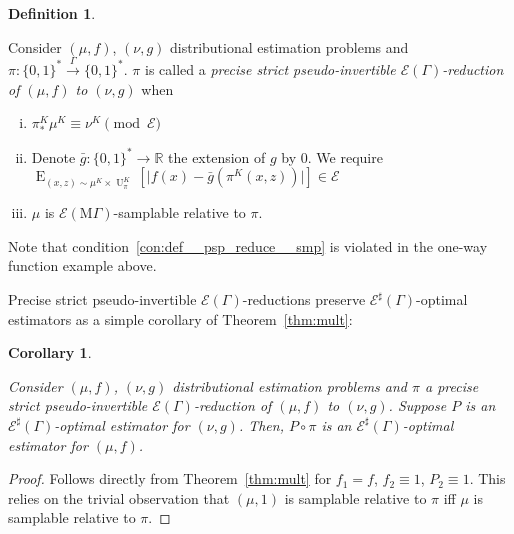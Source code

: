 \documentclass{article}
\numberwithin{equation}{section}
\theoremstyle{definition}
\newtheorem{definition}{Definition}[section]
\theoremstyle{plain}
\newtheorem{corollary}{Corollary}[section]
\newcommand{\Bool}{\{0,1\}}
\newcommand{\Words}{{\Bool^*}}
\DeclareMathOperator{\E}{E}
\DeclareMathOperator{\Un}{U}
\newcommand{\Reals}{\mathbb{R}}
\newcommand{\Abs}[1]{\lvert #1 \rvert}
\newcommand{\MGrow}{\mathrm{M}\Gamma}
\newcommand{\Fall}{\mathcal{E}}
\newcommand{\EG}{\Fall(\Gamma)}
\newcommand{\ESG}{\Fall^\sharp(\Gamma)}
\newcommand{\EMG}{\Fall(\MGrow)}
\newcommand{\Scheme}{\xrightarrow{\Gamma}}
\begin{document}
\begin{samepage}
\begin{definition}
\label{def:psp_reduce}

Consider $(\mu,f)$, $(\nu,g)$ distributional estimation problems and ${\pi: \Words \Scheme \Words}$. $\pi$ is called a \emph{precise strict pseudo-invertible $\EG$-reduction of $(\mu,f)$ to $(\nu,g)$} when

\begin{enumerate}[(i)]

\item\label{con:def__psp_reduce__dist} $\pi_*^K\mu^{K} \equiv \nu^{K} \pmod \Fall$

\item\label{con:def__psp_reduce__fun} Denote ${\bar{g}: \Words \rightarrow \Reals}$ the extension of $g$ by 0. We require $\E_{(x,z) \sim \mu^{K} \times \Un_\pi^{K}}[\Abs{f(x)-\bar{g}(\pi^{K}(x,z))}] \in \Fall$

\item\label{con:def__psp_reduce__smp} $\mu$ is $\EMG$-samplable relative to $\pi$.

\end{enumerate}

\end{definition}
\end{samepage}

Note that condition~\ref{con:def__psp_reduce__smp} is violated in the one-way function example above.

Precise strict pseudo-invertible $\EG$-reductions preserve $\ESG$-optimal estimators as a simple corollary of Theorem~\ref{thm:mult}:

\begin{samepage}
\begin{corollary}
\label{crl:psp_reduce_sharp}

Consider $(\mu,f)$, $(\nu,g)$ distributional estimation problems and $\pi$ a precise strict pseudo-invertible $\EG$-reduction of $(\mu, f)$ to $(\nu, g)$. Suppose $P$ is an $\ESG$-optimal estimator for $(\nu, g)$. Then, $P \circ \pi$ is an $\ESG$-optimal estimator for $(\mu, f)$.

\end{corollary}
\end{samepage}

\begin{proof}

Follows directly from Theorem~\ref{thm:mult} for $f_1 = f$, ${f_2 \equiv 1}$, $P_2 \equiv 1$. This relies on the trivial observation that $(\mu, 1)$ is samplable relative to $\pi$ iff $\mu$ is samplable relative to $\pi$.
%
\end{proof}
\end{document}
